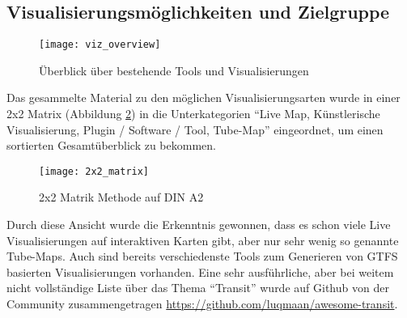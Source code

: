 \subsection{Visualisierungsmöglichkeiten und Zielgruppe}
\label{sub:visualisierungsmöglichkeiten_und_zielgruppe}
  \begin{figure}[ht]
    \begin{center}
      \texttt{[image: viz\_overview]}
      \caption{Überblick über bestehende Tools und Visualisierungen}
      \label{fig:viz_overview}
    \end{center}
  \end{figure}

  Das gesammelte Material zu den möglichen Visualisierungsarten wurde in einer 2x2 Matrix (Abbildung \ref{fig:2x2_matrix}) in die Unterkategorien "`Live Map, Künstlerische Visualisierung, Plugin / Software / Tool, Tube-Map"' eingeordnet, um einen sortierten Gesamtüberblick zu bekommen. 

  \begin{figure}[htbp]
    \begin{center}
      \texttt{[image: 2x2\_matrix]}
      \caption{2x2 Matrik Methode auf DIN A2}
      \label{fig:2x2_matrix}
    \end{center}
  \end{figure}

  Durch diese Ansicht wurde die Erkenntnis gewonnen, dass es schon viele Live Visualisierungen auf interaktiven Karten gibt, aber nur sehr wenig so genannte Tube-Maps. Auch sind bereits verschiedenste Tools zum Generieren von GTFS basierten Visualisierungen vorhanden. Eine sehr ausführliche, aber bei weitem nicht vollständige Liste über das Thema "`Transit"' wurde auf Github von der Community zusammengetragen \url{https://github.com/luqmaan/awesome-transit}.


